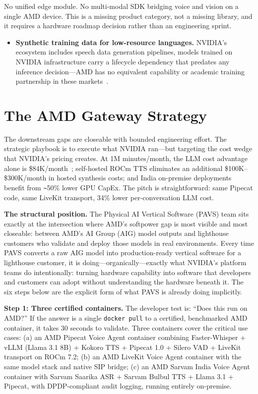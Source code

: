 \documentclass[blind]{gtac}
\begin{document}
No unified edge module. No multi-modal SDK bridging voice and vision on a single AMD device. This is a missing product category, not a missing library, and it requires a hardware roadmap decision rather than an engineering sprint.

\begin{itemize}
  \item \textbf{Synthetic training data for low-resource languages.} NVIDIA's ecosystem includes speech data generation pipelines, models trained on NVIDIA infrastructure carry a lifecycle dependency that predates any inference decision---AMD has no equivalent capability or academic training partnership in these markets~\cite{indic_asr,sarvam_asr}.
\end{itemize}

\section{The AMD Gateway Strategy}
\label{sec:gateway}

The downstream gaps are closeable with bounded engineering effort. The strategic playbook is to execute what NVIDIA ran---but targeting the cost wedge that NVIDIA's pricing creates. At 1M minutes/month, the LLM cost advantage alone is \$84K/month~\cite{spheron_rocm,vllm_rocm}; self-hosted ROCm TTS eliminates an additional \$100K--\$300K/month in hosted synthesis costs; and India on-premise deployments benefit from \texttt{\textasciitilde}50\% lower GPU CapEx. The pitch is straightforward: same Pipecat code, same LiveKit transport, 34\% lower per-conversation LLM cost.

\textbf{The structural position.}
The Physical AI Vertical Software (PAVS) team sits exactly at the intersection where AMD's softpower gap is most visible and most closeable: between AMD's AI Group (AIG) model outputs and lighthouse customers who validate and deploy those models in real environments. Every time PAVS converts a raw AIG model into production-ready vertical software for a lighthouse customer, it is doing---organically---exactly what NVIDIA's platform teams do intentionally: turning hardware capability into software that developers and customers can adopt without understanding the hardware beneath it. The six steps below are the explicit form of what PAVS is already doing implicitly.

\textbf{Step 1: Three certified containers.}
The developer test is: ``Does this run on AMD?'' If the answer is a single \texttt{docker pull} to a certified, benchmarked AMD container, it takes 30 seconds to validate. Three containers cover the critical use cases: (a) an AMD Pipecat Voice Agent container combining Faster-Whisper + vLLM (Llama 3.1 8B) + Kokoro TTS + Pipecat 1.0 + Silero VAD + LiveKit transport on ROCm 7.2; (b) an AMD LiveKit Voice Agent container with the same model stack and native SIP bridge; (c) an AMD Sarvam India Voice Agent container with Sarvam Saarika ASR + Sarvam Bulbul TTS + Llama 3.1 + Pipecat, with DPDP-compliant audit logging, running entirely on-premise.
\end{document}
